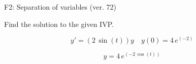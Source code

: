 \begin{exercise}
  \begin{exerciseTitle}F2: Separation of variables (ver. 72)\end{exerciseTitle}
  \begin{exerciseStatement}
    
Find the solution to the given IVP.

    
\[y'=( 2 \, \sin\left(t\right) )y\hspace{1em} y(0)= 4 \, e^{\left(-2\right)}\]

  \end{exerciseStatement}
  \begin{exerciseAnswer}
    
\[y= 4 \, e^{\left(-2 \, \cos\left(t\right)\right)}\]

  \end{exerciseAnswer}
\end{exercise}